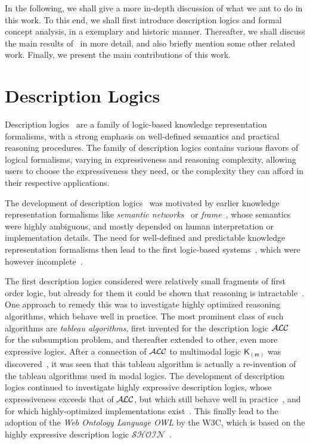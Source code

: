 In the following, we shall give a more in-depth discussion of what we ant to do in this
work.  To this end, we shall first introduce description logics and formal concept
analysis, in a exemplary and historic manner.  Thereafter, we shall discuss the main
results of~\cite{Diss-Felix} in more detail, and also briefly mention some other related
work.  Finally, we present the main contributions of this work.

\section{Description Logics}
\label{sec:repr-knowl-using}

Description logics~\cite{DLhandbook} are a family of logic-based knowledge representation
formalisms, with a strong emphasis on well-defined semantics and practical reasoning
procedures.  The family of description logics contains various flavors of logical
formalisms, varying in expressiveness and reasoning complexity, allowing users to choose
the expressiveness they need, or the complexity they can afford in their respective
applications.

The development of description logics~\cite{journals/sLogica/BaaderS01} was motivated by
earlier knowledge representation formalisms like \emph{semantic
  networks}~\cite{SemanticNetworks} or \emph{frame}~\cite{Minsky-Frames}, whose semantics
were highly ambiguous, and mostly depended on human interpretation or implementation
details.  The need for well-defined and predictable knowledge representation formalisms
then lead to the first logic-based systems~\cite{journals/cogsci/BrachmanS85}, which were
however incomplete~\cite{conf/kr/Schmidt-Schauss89}.

The first description logics considered were relatively small fragments of first order
logic, but already for them it could be shown that reasoning is
intractable~\cite{conf/aaai/BrachmanL84,journals/ai/Nebel88}.  One approach to remedy this
was to investigate highly optimized reasoning algorithms, which behave well in practice.
The most prominent class of such algorithms are \emph{tableau algorithms}, first invented
for the description logic
$\mathcal{A}\kern-0.05em\mathcal{L}\mathcal{C}$~\cite{journals/ai/Schmidt-SchaussS91,conf/ecai/HollunderNS90} for the subsumption
problem, and thereafter extended to other, even more expressive logics.  After a
connection of $\mathcal{A}\kern-0.05em\mathcal{L}\mathcal{C}$ to multimodal logic $\mathsf{K}_{(\mathsf{m})}$ was
discovered~\cite{DBLP:conf/ijcai/Schild91}, it was seen that this tableau algorithm is
actually a re-invention of the tableau algorithms used in modal logics.  The development
of description logics continued to investigate highly expressive description logics, whose
expressiveness exceeds that of $\mathcal{A}\kern-0.05em\mathcal{L}\mathcal{C}$, but which still behave well in
practice~\cite{journals/igpl/HorrocksST00}, and for which highly-optimized implementations
exist~\cite{sirin_pellet:practical_2007,Haarslev:2001,DBLP:conf/cade/TsarkovH06}.  This
finally lead to the adoption of the \emph{Web Ontology Language OWL} by the W3C, which is
based on the highly expressive description logic
$\mathcal{S}\mathcal{H}\mathcal{O}\mathcal{I}\mathcal{N}$~\cite{horrocks03fromshiqrdftoowl}.

